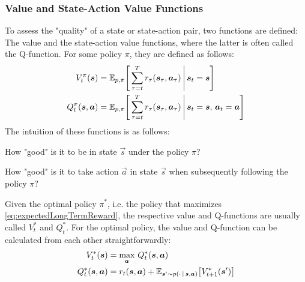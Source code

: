 			\subsubsection{Value and State-Action Value Functions}
				To assess the "quality" of a state or state-action pair, two functions are defined: The value and the state-action value functions, where the latter is often called the Q-function. For some policy \(\pi\), they are defined as follows:
				\begin{align*}
					V_t^\pi(\bm{s})          & = \mathbb{E}_{p, \pi}\Bigg[ \sum_{\tau = t}^{T} r_\tau(\bm{s}_\tau, \bm{a}_\tau) \,\Bigg\vert\, \bm{s}_t = \bm{s} \Bigg]                        \\
					Q_t^\pi(\bm{s}, \bm{a}) & = \mathbb{E}_{p, \pi}\Bigg[ \sum_{\tau = t}^{T} r_\tau(\bm{s}_\tau, \bm{a}_\tau) \,\Bigg\vert\, \bm{s}_t = \bm{s},\, \bm{a}_t = \bm{a} \Bigg]
				\end{align*}
				The intuition of these functions is as follows:
				\begin{description}[leftmargin = 3.5cm]
					\item[Value Function] How "good" is it to be in state \( \vec{s} \) under the policy \(\pi\)?
					\item[Q-Function]     How "good" is it to take action \( \vec{a} \) in state \( \vec{s} \) when subsequently following the policy \(\pi\)?
				\end{description}
				Given the optimal policy \( \pi^\ast \), i.e. the policy that maximizes \eqref{eq:expectedLongTermReward}, the respective value and Q-functions are usually called \( V_t^\ast \) and \( Q_t^\ast \). For the optimal policy, the value and Q-function can be calculated from each other straightforwardly:
				\begin{equation*}
					\begin{aligned}
						V_t^\ast(\bm{s})          & = \max_{\bm{a}} \, Q_t^\ast(\bm{s}, \bm{a})                                                                    \\
						Q_t^\ast(\bm{s}, \bm{a}) & = r_t(\bm{s}, \bm{a}) + \mathbb{E}_{\bm{s}' \sim p(\cdot \,\vert\, \bm{s}, \bm{a})}\big[ V_{t + 1}^\ast(\bm{s}') \big]
					\end{aligned}  \label{eq:valueQFuncRelations}
				\end{equation*}

